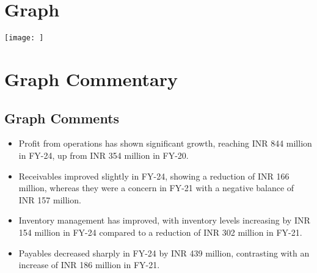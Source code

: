 \documentclass{article}
\begin{document}
\section*{Graph}
\begin{center}
    \texttt{[image:   ]}
\end{center}

\section*{Graph Commentary}
\begin{tcolorbox}[colback=white]
\subsection*{Graph Comments}
\begin{itemize}
    \renewcommand\labelitemi{--}
    
    \item Profit from operations has shown significant growth, reaching INR 844 million in FY-24, up from INR 354 million in FY-20.
    
    \item Receivables improved slightly in FY-24, showing a reduction of INR 166 million, whereas they were a concern in FY-21 with a negative balance of INR 157 million.
    
    \item Inventory management has improved, with inventory levels increasing by INR 154 million in FY-24 compared to a reduction of INR 302 million in FY-21.
    
    \item Payables decreased sharply in FY-24 by INR 439 million, contrasting with an increase of INR 186 million in FY-21.
    
\end{itemize}
\end{tcolorbox}
\end{document}
